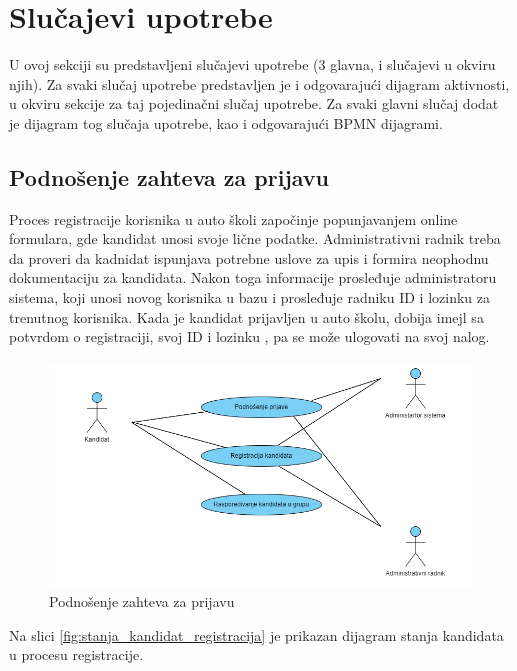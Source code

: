 \section{Slučajevi upotrebe}
\label{sec:podnaslov2}
U ovoj sekciji su predstavljeni slučajevi upotrebe (3 glavna, i slučajevi u okviru njih).
Za svaki slučaj upotrebe predstavljen je i odgovarajući dijagram aktivnosti, 
u okviru sekcije za taj pojedinačni slučaj upotrebe.
Za svaki glavni slučaj dodat je dijagram tog slučaja upotrebe, kao i odgovarajući BPMN dijagrami.
\subsection {Podnošenje zahteva za prijavu}
Proces registracije korisnika u auto školi započinje popunjavanjem online formulara, gde kandidat unosi svoje lične podatke. Administrativni radnik treba da proveri da kadnidat ispunjava potrebne uslove za upis i formira neophodnu dokumentaciju za kandidata. Nakon toga informacije prosleđuje administratoru sistema, koji unosi novog korisnika u bazu i prosleđuje radniku ID i lozinku za trenutnog korisnika. Kada je kandidat prijavljen u auto školu, dobija imejl sa potvrdom o registraciji, svoj ID i lozinku , pa se može ulogovati na svoj nalog. 

\begin{figure}[H]
    \begin{center}
        \includegraphics[width=120mm, height=60mm]{Diagrams/podnosenje_zahteva_za_prijavu.png}
    \end{center}
    \caption {Podnošenje zahteva za prijavu}
    \label{usecase_podnosenje_zahteva_za_prijavu}

\end{figure}

Na slici \ref{fig:stanja_kandidat_registracija} je prikazan dijagram stanja kandidata u procesu registracije.

